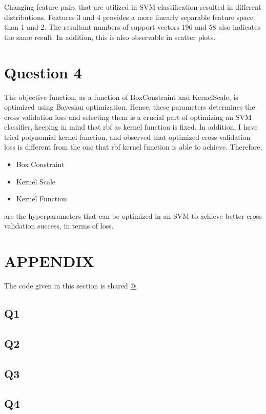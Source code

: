 \documentclass[11pt]{extarticle}
\begin{document}
\vspace*{-1cm}
Changing feature pairs that are utilized in SVM classification resulted in different distributions. Features 3 and 4
provides a more linearly separable feature space than 1 and 2. The resultant numbers of support vectors 196 and 58 also
indicates the same result. In addition, this is also observable in scatter plots.

\section{Question 4}

The objective function, as a function of BoxConstraint and KernelScale, is optimized using Bayesian optimization.
Hence, these parameters determines the cross validation loss and selecting them is a crucial part of optimizing an
SVM classifier, keeping in mind that rbf as kernel function is fixed. In addition, I have tried polynomial kernel
function, and observed that optimized cross validation loss is different from the one that rbf kernel function is
able to achieve. Therefore,
\begin{itemize}
    \item Box Constraint
    \item Kernel Scale
    \item Kernel Function
\end{itemize}
are the hyperparameters that can be optimized in an SVM to achieve better cross validation success, in terms of loss.

\pagebreak
\section{APPENDIX}
The code given in this section is shared \href{https://github.com/kutay-ugurlu/Pattern-Recognition/tree/master/HW3}{@\faGithubSquare}.
\subsection{Q1}\label{subsec:Q1_code}

\pagebreak
\subsection{Q2} \label{subsec:Q2_code}

\pagebreak
\subsection{Q3}\label{subsec:Q3_code}

\pagebreak
\subsection{Q4}\label{subsec:Q4_code}

\end{document}
